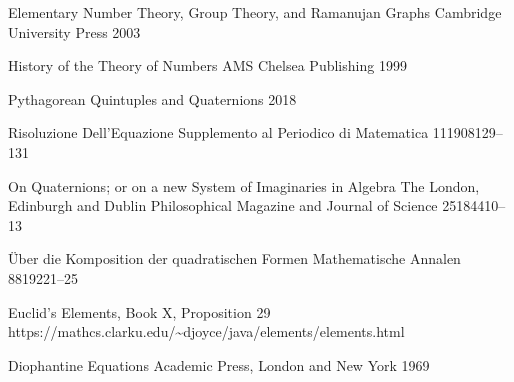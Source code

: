 \documentclass[12pt,table]{article}
\theoremstyle{definition}
\theoremstyle{remark}
\numberwithin{equation}{section}
\begin{document}
\begin{thebibliography}{1}




         {Elementary Number Theory,
           Group Theory,
           and Ramanujan Graphs}
         {Cambridge University Press}
         {2003}

         {History of the Theory of Numbers}
         {AMS Chelsea Publishing}
         {1999}

        {Pythagorean Quintuples and Quaternions}
        {2018}



        {Risoluzione Dell'Equazione}
        {Supplemento al Periodico di Matematica}
        {11}{1908}{129--131}


        {On Quaternions; or on a new System of Imaginaries in Algebra}
        {The London, Edinburgh and Dublin Philosophical Magazine
         and Journal of Science}
        {25}{1844}{10--13}


        {\"Uber die Komposition der quadratischen Formen}
        {Mathematische Annalen}
        {88}{1922}{1--25}



        {Euclid's Elements, Book X, Proposition 29}
        {\\https://mathcs.clarku.edu/\~{}djoyce/java/elements/elements.html}

         {Diophantine Equations}
         {Academic Press, London and New York} 
         {1969}




\end{thebibliography}
\end{document}

